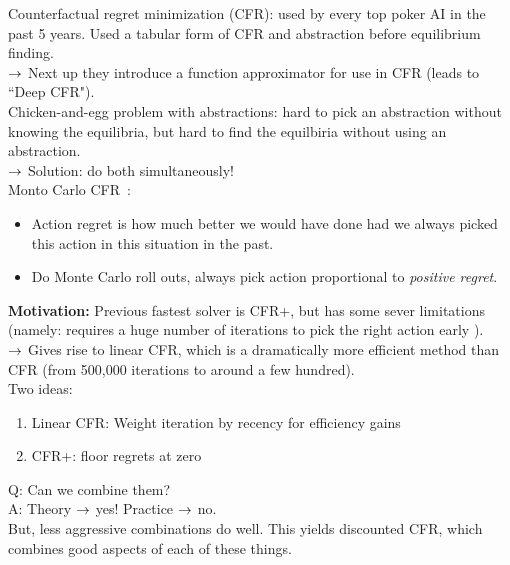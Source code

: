 Counterfactual regret minimization (CFR): used by every top poker AI in the past 5 years. Used a tabular form of CFR and abstraction before equilibrium finding. \\

$\rightarrow$ Next up they introduce a function approximator for use in CFR (leads to ``Deep CFR"). \\

Chicken-and-egg problem with abstractions: hard to pick an abstraction without knowing the equilibria, but hard to find the equilbiria without using an abstraction. \\

$\rightarrow$ Solution: do both simultaneously! \\

Monto Carlo CFR~\cite{lanctot2009monte}:
\begin{itemize}
    \item Action regret is how much better we would have done had we always picked this action in this situation in the past.
    \item Do Monte Carlo roll outs, always pick action proportional to {\it positive regret}.
\end{itemize}


{\bf Motivation:} Previous fastest solver is CFR+, but has some sever limitations (namely: requires a huge number of iterations to pick the right action early ). \\

$\rightarrow$ Gives rise to linear CFR, which is a dramatically more efficient method than CFR (from 500,000 iterations to around a few hundred). \\

Two ideas:
\begin{enumerate}
    \item Linear CFR: Weight iteration by recency for efficiency gains
    \item CFR+: floor regrets at zero
\end{enumerate}

Q: Can we combine them? \\

A: Theory $\rightarrow$ yes! Practice $\rightarrow$ no. \\

But, less aggressive combinations do well. This yields discounted CFR, which combines good aspects of each of these things. \\

